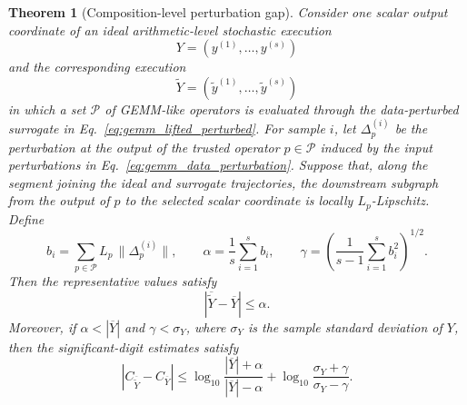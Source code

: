 \documentclass[manuscript, screen]{acmart}
\newtheorem{theorem}{Theorem}
\begin{document}
\begin{theorem}[Composition-level perturbation gap]
\label{thm:composition_perturbation_gap}
Consider one scalar output coordinate of an ideal arithmetic-level stochastic
execution
\[
Y=(y^{(1)},\ldots,y^{(s)})
\]
and the corresponding execution
\[
\widetilde{Y}=(\widetilde{y}^{(1)},\ldots,\widetilde{y}^{(s)})
\]
in which a set $\mathcal{P}$ of GEMM-like operators is evaluated through the
data-perturbed surrogate in Eq.~\eqref{eq:gemm_lifted_perturbed}. For sample
$i$, let $\Delta_p^{(i)}$ be the perturbation at the output of the trusted
operator $p\in\mathcal{P}$ induced by the input perturbations in
Eq.~\eqref{eq:gemm_data_perturbation}. Suppose that, along the segment joining
the ideal and surrogate trajectories, the downstream subgraph from the output
of $p$ to the selected scalar coordinate is locally $L_p$-Lipschitz. Define
\begin{equation}
b_i =
\sum_{p\in\mathcal{P}} L_p\,\|\Delta_p^{(i)}\|,
\qquad
\alpha=\frac{1}{s}\sum_{i=1}^{s}b_i,
\qquad
\gamma=
\left(\frac{1}{s-1}\sum_{i=1}^{s}b_i^2\right)^{1/2}.
\label{eq:composition_gap_terms}
\end{equation}
Then the representative values satisfy
\begin{equation}
\left|
\overline{\widetilde{Y}}-\overline{Y}
\right|
\le \alpha.
\label{eq:representative_gap_bound}
\end{equation}
Moreover, if $\alpha<|\overline{Y}|$ and $\gamma<\sigma_Y$, where
$\sigma_Y$ is the sample standard deviation of $Y$, then the significant-digit
estimates satisfy
\begin{equation}
\left|
C_{\overline{\widetilde{Y}}}
-
C_{\overline{Y}}
\right|
\le
\log_{10}
\frac{|\overline{Y}|+\alpha}
     {|\overline{Y}|-\alpha}
+
\log_{10}
\frac{\sigma_Y+\gamma}
     {\sigma_Y-\gamma}.
\label{eq:composition_digit_gap_bound}
\end{equation}
\end{theorem}
\end{document}
